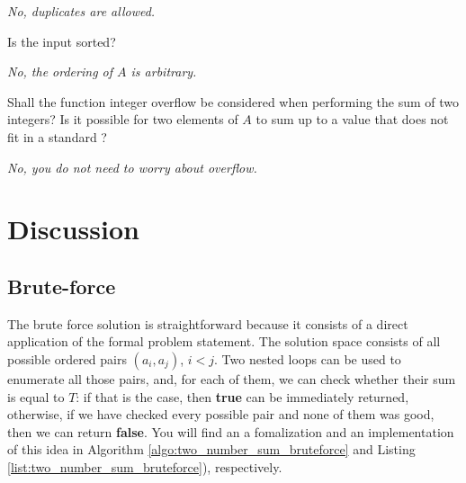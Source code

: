 \begin{QandA}
\begin{questionitem}
    \begin{answered}
		\textit{No, duplicates are allowed.}
	\end{answered} \end{questionitem}
	\item \begin{questionitem} \begin{question} Is the input sorted?  \end{question} 	 
    \begin{answered}
		\textit{No, the ordering of $A$ is arbitrary.}
	\end{answered} \end{questionitem}
	\item \begin{questionitem} \begin{question} Shall the function integer overflow be considered when performing the sum of two integers? Is it possible for two elements of $A$ to sum up to a value that does not fit in a standard ?  \end{question} 	 
    \begin{answered}
		\textit{No, you do not need to worry about overflow.}
	\end{answered} \end{questionitem}
\end{QandA}


\section{Discussion}

\subsection{Brute-force}
\label{sec:two_numbers:bruteforce}

The brute force solution is straightforward because it consists of a direct application of the formal problem statement. 
The solution space consists of all possible ordered pairs $(a_i,a_j)$, $i < j$. 
Two nested loops can be used to enumerate all those pairs, and, for each of them, we can check whether their sum is equal to $T$: if that is the case,
then   \textbf{true} can be immediately returned, otherwise, if we have checked every possible pair and none of them was good, then we can return  \textbf{false}.
You will find an a fomalization and an implementation of this idea in Algorithm \ref{algo:two_number_sum_bruteforce}
and Listing \ref{list:two_number_sum_bruteforce}), respectively.

